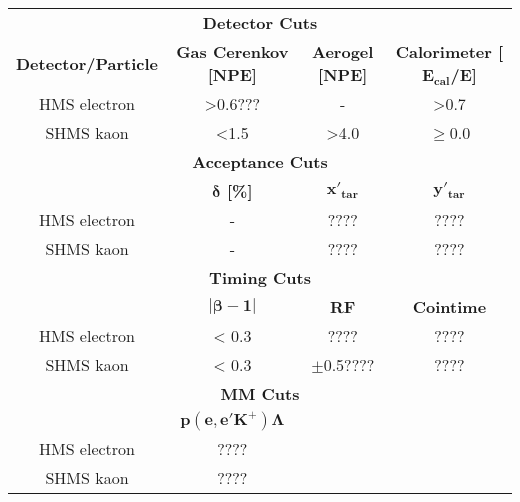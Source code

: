 \begin{table}[ht]
  \centering
  \begin{tabular}{cccc}
    \multicolumn{4}{c}{\large\textbf{Detector Cuts}} \\    
    \textbf{Detector/Particle} & \textbf{Gas Cerenkov [NPE]} & \textbf{Aerogel [NPE]} & \textbf{Calorimeter [$\mathbf{E_{cal}}$/E]} \\
    \hline
    HMS electron & >0.6??? & -    & >0.7     \\
    SHMS kaon    & <1.5    & >4.0 & $\ge$0.0 \\
    \multicolumn{4}{c}{\large\textbf{Acceptance Cuts}} \\
     & \textbf{$\mathbf{\delta}$ [\%]} & \textbf{$\mathbf{x'_{tar}}$} & \textbf{$\mathbf{y'_{tar}}$}  \\
    \hline
    HMS electron & - & ????  & ???? \\
    SHMS kaon    & - & ????  & ???? \\
    \multicolumn{4}{c}{\large\textbf{Timing Cuts}} \\
     & \textbf{$\mathbf{\left|\beta-1\right|}$}  & \textbf{RF} & \textbf{Cointime} \\
    \hline
    HMS electron & < 0.3 & ????          & ???? \\
    SHMS kaon    & < 0.3 &  $\pm$0.5???? & ???? \\
    \multicolumn{4}{c}{\large\textbf{MM Cuts}} \\
     & \textbf{$\mathbf{p(e, e'K^+)\Lambda}$}  &  & \\
    \hline
    HMS electron & ???? & & \\
    SHMS kaon    & ???? & & \\
  \end{tabular}
  \caption{}
  \label{tab:3-3_cuts}
\end{table}

